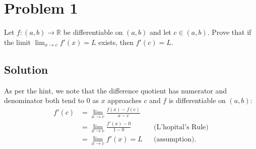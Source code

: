 \documentclass{article}
\title{\mytitle}
\author{\myname}
\date{\today}
\theoremstyle{plain}
\newcommand{\R}{\mathbb{R}}
\begin{document}
\maketitle
\section*{Problem 1}
Let $f:(a,b)\to\R$ be differentiable on $(a,b)$ and let $c\in(a,b)$. Prove that if
the limit $\lim_{x\to c}f'(x)=L$ exists, then $f'(c)=L$.
\subsection*{Solution}
As per the hint, we note that the difference quotient has numerator and
denominator both tend to $0$ as $x$ approaches $c$ and $f$ is differentiable on $(a,b)$:
\begin{align*}
  f'(c)&=\lim_{x\to c}\frac{f(x)-f(c)}{x-c}\\
  &=\lim_{x\to c}\frac{f'(x)-0}{1-0} && \text{(L'hopital's Rule)}\\
  &=\lim_{x\to c}f'(x)=L && \text{(assumption)}.
\end{align*}
\end{document}

